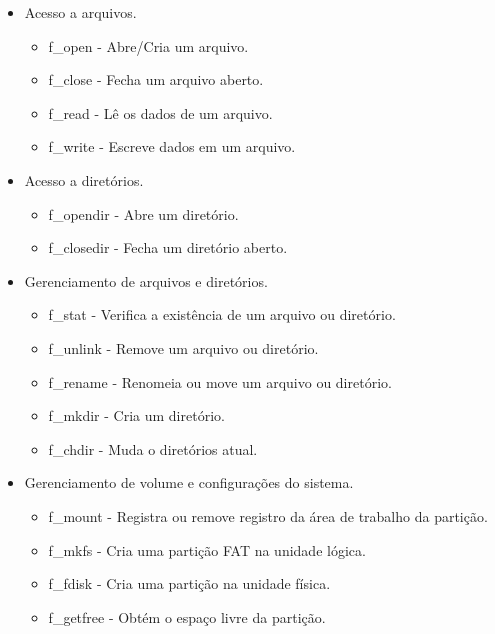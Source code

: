 \begin{itemize}
    \item Acesso a arquivos.
    \begin{itemize}
        \item f\_open - Abre/Cria um arquivo.
        \item f\_close - Fecha um arquivo aberto.
        \item f\_read - Lê os dados de um arquivo.
        \item f\_write - Escreve dados em um arquivo.
    \end{itemize}
    \item Acesso a diretórios.
    \begin{itemize}
        \item f\_opendir - Abre um diretório.
        \item f\_closedir - Fecha um diretório aberto.
    \end{itemize}
    \item Gerenciamento de arquivos e diretórios.
    \begin{itemize}
        \item f\_stat - Verifica a existência de um arquivo ou diretório.
        \item f\_unlink - Remove um arquivo ou diretório. 
        \item f\_rename - Renomeia ou move um arquivo ou diretório.
        \item f\_mkdir - Cria um diretório.
        \item f\_chdir - Muda o diretórios atual.
    \end{itemize}
    \item Gerenciamento de volume e configurações do sistema.
    \begin{itemize}
        \item f\_mount - Registra ou remove registro da área de trabalho da partição.
        \item f\_mkfs - Cria uma partição FAT na unidade lógica.
        \item f\_fdisk - Cria uma partição na unidade física.
        \item f\_getfree - Obtém o espaço livre da partição.
    \end{itemize}
\end{itemize}

